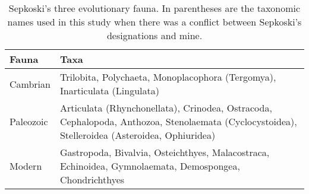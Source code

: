 \documentclass[12pt,letterpaper]{article}
\begin{document}



\begin{table}
  \centering
  \begin{tabular}{l | p{}}
    \hline
    Fauna & Taxa \\
    \hline
    \hline
    Cambrian & Trilobita, Polychaeta, Monoplacophora (Tergomya), Inarticulata (Lingulata)\\[0.1cm]
    Paleozoic & Articulata (Rhynchonellata), Crinodea, Ostracoda, Cephalopoda, Anthozoa, Stenolaemata (Cyclocystoidea), Stelleroidea (Asteroidea, Ophiuridea) \\[0.1cm]
    Modern & Gastropoda, Bivalvia, Osteichthyes, Malacostraca, Echinoidea, Gymnolaemata, Demospongea, Chondrichthyes \\
    \hline
  \end{tabular}
  \caption{Sepkoski's three evolutionary fauna. In parentheses are the taxonomic names used in this study when there was a conflict between Sepkoski's designations and mine.}
  \label{tab:sepkoski}
\end{table}
\end{document}
